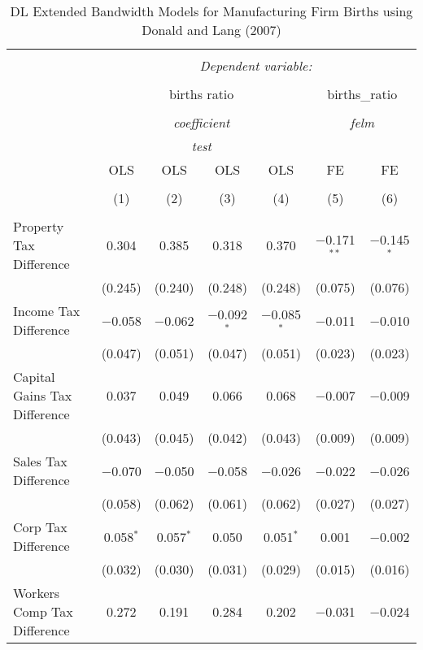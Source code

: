 
\begin{table}[!htbp] \centering 
  \caption{DL Extended Bandwidth Models for  Manufacturing Firm Births using Donald and Lang (2007)} 
  \label{} 
\begin{tabular}{@{\extracolsep{5pt}}lcccccc} 
\\[-1.8ex]\hline 
\hline \\[-1.8ex] 
 & \multicolumn{6}{c}{\textit{Dependent variable:}} \\ 
\cline{2-7} 
\\[-1.8ex] & \multicolumn{4}{c}{births ratio} & \multicolumn{2}{c}{births\_ratio} \\ 
\\[-1.8ex] & \multicolumn{4}{c}{\textit{coefficient}} & \multicolumn{2}{c}{\textit{felm}} \\ 
 & \multicolumn{4}{c}{\textit{test}} & \multicolumn{2}{c}{\textit{}} \\ 
 & OLS & OLS & OLS & OLS & FE & FE \\ 
\\[-1.8ex] & (1) & (2) & (3) & (4) & (5) & (6)\\ 
\hline \\[-1.8ex] 
 Property Tax Difference & 0.304 & 0.385 & 0.318 & 0.370 & $-$0.171$^{**}$ & $-$0.145$^{*}$ \\ 
  & (0.245) & (0.240) & (0.248) & (0.248) & (0.075) & (0.076) \\ 
  Income Tax Difference & $-$0.058 & $-$0.062 & $-$0.092$^{*}$ & $-$0.085$^{*}$ & $-$0.011 & $-$0.010 \\ 
  & (0.047) & (0.051) & (0.047) & (0.051) & (0.023) & (0.023) \\ 
  Capital Gains Tax Difference & 0.037 & 0.049 & 0.066 & 0.068 & $-$0.007 & $-$0.009 \\ 
  & (0.043) & (0.045) & (0.042) & (0.043) & (0.009) & (0.009) \\ 
  Sales Tax Difference & $-$0.070 & $-$0.050 & $-$0.058 & $-$0.026 & $-$0.022 & $-$0.026 \\ 
  & (0.058) & (0.062) & (0.061) & (0.062) & (0.027) & (0.027) \\ 
  Corp Tax Difference & 0.058$^{*}$ & 0.057$^{*}$ & 0.050 & 0.051$^{*}$ & 0.001 & $-$0.002 \\ 
  & (0.032) & (0.030) & (0.031) & (0.029) & (0.015) & (0.016) \\ 
  Workers Comp Tax Difference & 0.272 & 0.191 & 0.284 & 0.202 & $-$0.031 & $-$0.024 \\ 

\end{tabular}
\end{table}
